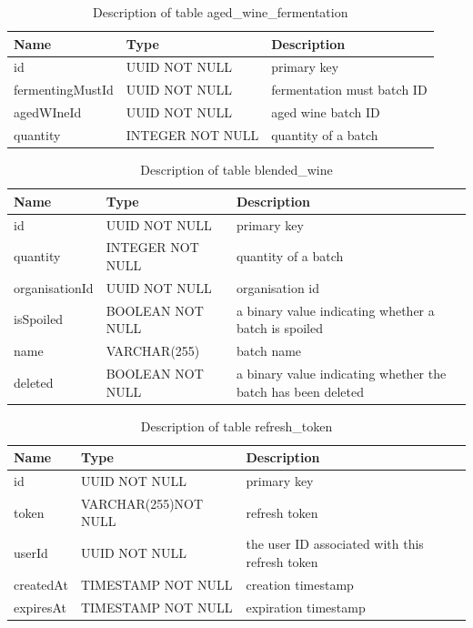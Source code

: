 \begin{table}[th]
	\centering
	\caption{Description of table aged\_wine\_fermentation}
	\begin{tabular}{|m{}|m{}|m{}|}
		\hline
		Name & Type & Description  \\ \hline
		id & UUID NOT NULL & primary key\\ \hline
		fermentingMustId & UUID NOT NULL & fermentation must batch ID\\ \hline
		agedWIneId & UUID NOT NULL & aged wine batch ID\\ \hline
		quantity & INTEGER NOT NULL & quantity of a batch\\ \hline
	\end{tabular}
\end{table}
\begin{table}[th]
	\centering
	\caption{Description of table blended\_wine}
	\begin{tabular}{|m{}|m{}|m{}|}
		\hline
		Name & Type & Description  \\ \hline
		id & UUID NOT NULL & primary key\\ \hline
		quantity & INTEGER NOT NULL & quantity of a batch\\ \hline
		organisationId & UUID NOT NULL & organisation id\\ \hline
		isSpoiled & BOOLEAN NOT NULL & a binary value indicating whether a batch is spoiled\\ \hline
		name & VARCHAR(255) & batch name\\ \hline
		deleted & BOOLEAN NOT NULL & a binary value indicating whether the batch has been deleted\\ \hline
	\end{tabular}
\end{table}
\begin{table}[th]
	\centering
	\caption{Description of table refresh\_token}
	\begin{tabular}{|m{}|m{}|m{}|}
		\hline
		Name & Type & Description  \\ \hline
		id & UUID NOT NULL & primary key\\ \hline
		token & VARCHAR(255)\newline NOT NULL & refresh token\\ \hline
		userId & UUID NOT NULL & the user ID associated with this refresh token\\ \hline
		createdAt & TIMESTAMP NOT NULL & creation timestamp\\ \hline
		expiresAt & TIMESTAMP NOT NULL & expiration timestamp\\ \hline
	\end{tabular}
\end{table}
